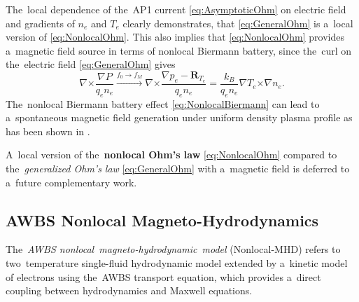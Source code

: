 \documentclass[
 aps,
 jmp,
 amsmath,amssymb,
 twocolumn,
]{revtex4-1}
\newcommand{\vect}[1]{\boldsymbol{#1}}
\newcommand{\qe}{q_e}
\newcommand{\Te}{T_e}
\newcommand{\ed}{n_e}
\newcommand{\kB}{k_B}
\newcommand{\fM}{f_M}
\newcommand{\fzero}{f_0}
\begin{document}
The~local dependence of the~AP1 current \eqref{eq:AsymptoticOhm} 
on electric field and gradients of $\ed$ and $\Te$ clearly demonstrates, 
that \eqref{eq:GeneralOhm} is a~local version of \eqref{eq:NonlocalOhm}.
This also implies that \eqref{eq:NonlocalOhm} provides 
a~magnetic field source in terms of nonlocal Biermann battery,
since the~curl on the~electric field 
\eqref{eq:GeneralOhm} gives
\begin{equation}
  \nabla\vect{\times} \frac{\nabla P}{\qe \ed} 
  \xrightarrow{\fzero \rightarrow \fM} 
  \nabla\vect{\times} \frac{\nabla p_e - \vect{R}_{\Te}}{\qe \ed} =
  \frac{\kB}{\qe\ed}\nabla \Te \vect{\times}\nabla \ed
  .
  \label{eq:NonlocalBiermann}
\end{equation}
The~nonlocal Biermann battery effect \eqref{eq:NonlocalBiermann} 
can lead to a~spontaneous magnetic field generation under uniform 
density plasma profile as has been shown in \cite{Kingham_PRL2002}.

A~local version of the~{\bf nonlocal Ohm's law} \eqref{eq:NonlocalOhm} 
compared to the~\textit{generalized Ohm's law} \eqref{eq:GeneralOhm} with
a~magnetic field is deferred to a~future complementary work.

\subsection{AWBS Nonlocal Magneto-Hydrodynamics}
\label{sec:ANTH}
The~\textit{AWBS nonlocal~magneto-hydrodynamic~model} (Nonlocal-MHD)
refers to two~temperature single-fluid hydrodynamic model 
extended by a~kinetic model of electrons using the~AWBS transport equation,
which provides a~direct coupling between hydrodynamics and Maxwell equations.
\end{document}
